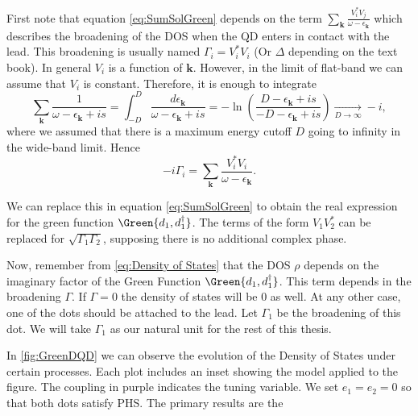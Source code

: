 First note that equation \eqref{eq:SumSolGreen} depends on the term $\sum_{\boldsymbol{k}}\frac{V_{i}^{*}V_{j}}{\omega-\epsilon_{\boldsymbol{k}}}$ which describes the broadening of the DOS when the QD enters in contact with the lead. This broadening is usually named $\Gamma_i=V_{i}^{*}V_{i}$ (Or $\Delta$ depending on the text book). 
In general $V_i$  is a function of $\textbf{k}$. However, in the limit of flat-band we can assume that $V_i $ is constant. Therefore, it is enough to integrate
\begin{equation}
    \sum_{\boldsymbol{k}}\frac{1}{\omega-\epsilon_{\boldsymbol{k}}+is}=\int_{-D}^{D}\frac{d\epsilon_{\boldsymbol{k}}}{\omega-\epsilon_{\boldsymbol{k}}+is}=-\ln\left(\frac{D-\epsilon_{\boldsymbol{k}}+is}{-D-\epsilon_{\boldsymbol{k}}+is}\right)\xrightarrow[D\rightarrow\infty]{}-i , 
\end{equation}
\noindent where we assumed that there is a maximum  energy cutoff $D$ going to infinity in the wide-band limit. Hence 
\begin{equation}
   -i\Gamma_i = \sum_{\boldsymbol{k}}\frac{V_{i}^{*}V_{i}}{\omega-\epsilon_{\boldsymbol{k}}}.
\end{equation}



We can replace this in equation \eqref{eq:SumSolGreen} to obtain the real expression for the green function $\Green{d_1,d_1^\dagger}$. The terms of the form $V_1V_2^*$ can be replaced for $\sqrt{\Gamma_1\Gamma_2}$, supposing there is no additional complex phase.

Now, remember from \eqref{eq:Density of States} that the DOS $\rho$ depends on the imaginary factor of the Green Function $\Green{d_1,d_1^\dagger}$. This term depends in the broadening $\Gamma$. If $\Gamma = 0$ the density of states will be $0$ as well. At any other case, one of the dots should be attached to the lead. Let $\Gamma_1$ be the broadening of this dot. We will take $\Gamma_1$ as our natural unit for the rest of this thesis.  

In \ref{fig:GreenDQD} we can observe the evolution of the Density of States under certain processes. Each plot includes an inset showing the model applied to the figure. The coupling in purple indicates the tuning variable. We set $e_1 = e_2 = 0$ so that both dots satisfy PHS. The primary results are the 

